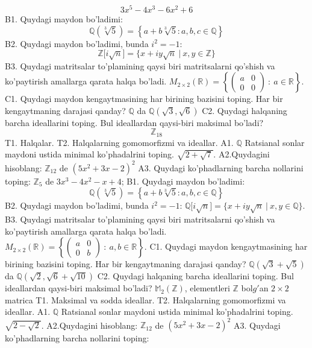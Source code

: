 \[3x^{5} - 4x^{3} - 6x^{2} + 6\]
B1. Quydagi maydon bo'ladimi:
\[\mathbb{Q}\left( \sqrt[3]{5} \right) = \left\{ a + b\sqrt[3]{5}:a,b,c \in \mathbb{Q} \right\}\]
B2. Quydagi maydon bo'ladimi, bunda \(i^{2} = - 1\):
\[\mathbb{Z\lbrack}i\sqrt{n}\rbrack = \{ x + iy\sqrt{n}\ |\ x,y \in \mathbb{Z\}}\]
B3. Quydagi matritsalar to'plamining qaysi biri matritsalarni qo'shish va ko'paytirish amallarga qarata halqa bo'ladi.
\(M_{2 \times 2}\mathbb{(R) =}\left\{ \begin{pmatrix}
a & 0 \\
0 & 0
\end{pmatrix}\ :\ a \in \mathbb{R} \right\}\).
C1. Quydagi maydon kengaytmasining har birining bazisini toping. Har bir kengaytmaning darajasi qanday?
\(\mathbb{Q}\) da \(\mathbb{Q}\left( \sqrt{3},\sqrt{6} \right)\)
C2. Quydagi halqaning barcha ideallarini toping. Bul ideallardan qaysi-biri maksimal bo'ladi?
\[\mathbb{Z}_{18}\]
T1. Halqalar.
T2. Halqalarning gomomorfizmi va ideallar.
A1. \(\mathbb{Q}\) Ratsianal sonlar maydoni ustida minimal ko'phadalrini toping.
\(\sqrt{2 + \sqrt{7}}\).
A2.Quydagini hisoblang:
\(\mathbb{Z}_{12}\) de \(\left( 5x^{2} + 3x - 2 \right)^{2}\)
A3. Quydagi ko'phadlarning barcha nollarini toping:
\(\mathbb{Z}_{5}\) de \(3x^{3} - 4x^{2} - x + 4\);
B1. Quydagi maydon bo'ladimi:
\[\mathbb{Q}\left( \sqrt[3]{5} \right) = \left\{ a + b\sqrt[3]{5}:a,b,c \in \mathbb{Q} \right\}\]
B2. Quydagi maydon bo'ladimi, bunda \(i^{2} = - 1\):
\(\mathbb{Q\lbrack}i\sqrt{n}\rbrack = \{ x + iy\sqrt{n}\ |\ x,y \in \mathbb{Q\}}\).
B3. Quydagi matritsalar to'plamining qaysi biri matritsalarni qo'shish va ko'paytirish amallarga qarata halqa bo'ladi.
\(M_{2 \times 2}\mathbb{(R) =}\left\{ \begin{pmatrix}
a & 0 \\
0 & b
\end{pmatrix}\ :\ a,b \in \mathbb{R} \right\}\).
C1. Quydagi maydon kengaytmasining har birining bazisini toping. Har bir kengaytmaning darajasi qanday?
\(\mathbb{Q}\left( \sqrt{3} + \sqrt{5} \right)\) da \(\mathbb{Q}\left( \sqrt{2},\sqrt{6} + \sqrt{10} \right)\)
C2. Quydagi halqaning barcha ideallarini toping. Bul ideallardan qaysi-biri maksimal bo'ladi?
\(\mathbb{M}_{2}\left( \mathbb{Z} \right)\), elementleri \(\mathbb{Z}\) bol\(g'\)an \(2 \times 2\) matrica
T1. Maksimal va sodda ideallar.
T2. Halqalarning gomomorfizmi va ideallar.
A1. \(\mathbb{Q}\) Ratsianal sonlar maydoni ustida minimal ko'phadalrini toping.
\(\sqrt{2 - \sqrt{2}}\).
A2.Quydagini hisoblang:
\(\mathbb{Z}_{12}\) de \(\left( 5x^{2} + 3x - 2 \right)^{2}\)
A3. Quydagi ko'phadlarning barcha nollarini toping:
